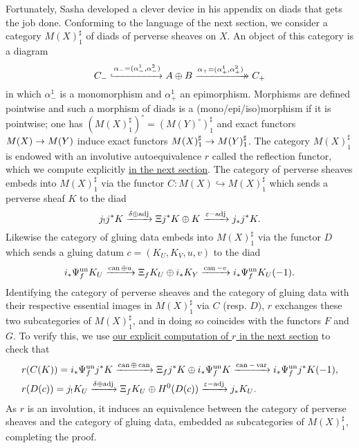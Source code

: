 \documentclass[deligne.tex]{subfiles}
\begin{document}
Fortunately, Sasha developed a clever device in his appendix on diads that
gets the job done.
Conforming to the language of the next section, we consider a category 
$M(X)_1^\sharp$ of diads of perverse sheaves on $X$.
An object of this category is a diagram
\begin{equation*}
	C_-\xhookrightarrow{\alpha_-=(\alpha_-^1,\alpha_-^2)}
	A\oplus B\xrightarrow[]{\alpha_+=(\alpha_+^1,\alpha_+^2)}\mathrel{\mkern-14mu}\rightarrow C_+
\end{equation*}
in which $\alpha_-^1$ is a monomorphism and $\alpha_+^1$ an epimorphism.
Morphisms are defined pointwise and such a morphism of diads is a
(mono/epi/iso)morphism if it is pointwise; one has
$(M(X)_1^\sharp)^\circ=(M(Y)^\circ)_1^\sharp$ and exact functors
$M(X)\rightarrow M(Y)$ induce exact functors $M(X)_1^\sharp\rightarrow M(Y)_1^\sharp$.
The category $M(X)_1^\sharp$ is endowed with an involutive autoequivalence
$r$ called the reflection functor, which we compute explicitly
\hyperref[sec:reflection]{in the next section}.
The category of perverse sheaves embeds into
$M(X)_1^\sharp$ via the functor $C:M(X)\hookrightarrow M(X)_1^\sharp$ which
sends a perverse sheaf $K$ to the diad
\begin{equation*}
	j_!j^*K\xrightarrow{\delta\oplus\operatorname{adj}}\Xi j^*K\oplus K\xrightarrow{\varepsilon-\operatorname{adj}}j_*j^*K.
\end{equation*}
Likewise the category of gluing data embeds into $M(X)_1^\sharp$ via the 
functor $D$ which sends a gluing datum $c=(K_U,K_V,u,v)$ to the diad
\begin{equation*}
	i_*\Psi_f^{\mathrm{un}}K_U\xrightarrow{\operatorname{can}\oplus u}\Xi_fK_U\oplus i_*K_Y\xrightarrow{\operatorname{can}-v}i_*\Psi_f^{\mathrm{un}}K_U(-1).
\end{equation*}
Identifying the category of perverse sheaves and the category of gluing 
data with their respective essential images in $M(X)_1^\sharp$ via $C$
(resp. $D$), $r$ exchanges these two subcategories of $M(X)_1^\sharp$, and
in doing so coincides with the functors $F$ and $G$. To verify this, we use
\hyperref[sec:reflection]{our explicit computation of $r$ in the next section}
to check that
\begin{align*}
	&r(C(K))=i_*\Psi_f^{\mathrm{un}}j^*K\xrightarrow{\operatorname{can}\oplus\operatorname{can}}\Xi_fj^*K\oplus i_*\Psi_f^{\mathrm{un}}K\xrightarrow{\operatorname{can}-\operatorname{var}}i_*\Psi_f^{\mathrm{un}}j^*K(-1), \\
	&r(D(c))=j_!K_U\xrightarrow{\delta\oplus\operatorname{adj}}\Xi_fK_U\oplus H^0(D(c))
	\xrightarrow{\varepsilon-\operatorname{adj}}j_*K_U.
\end{align*}
As $r$ is an involution, it induces an equivalence between
the category of perverse sheaves and the category of gluing data, embedded
as subcategories of $M(X)_1^\sharp$, completing the proof.
\end{document}
